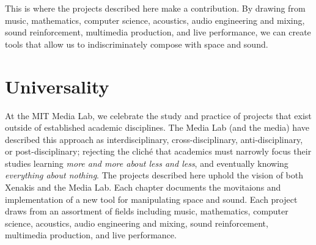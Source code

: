 This is where the projects described here make a contribution.  By
drawing from music, mathematics, computer science, acoustics, audio
engineering and mixing, sound reinforcement, multimedia production,
and live performance, we can create tools that allow us to
indiscriminately compose with space and sound.

\section{Universality}
\label{sec:universality}
At the MIT Media Lab, we celebrate the study and practice of projects
that exist outside of established academic disciplines. The Media Lab
(and the media) have described this approach as interdisciplinary,
cross-disciplinary, anti-disciplinary, or post-disciplinary; rejecting
the clich\'{e} that academics must narrowly focus their studies
learning \textit{more and more about less and less}, and eventually
knowing \textit{everything about nothing}.  The projects described
here uphold the vision of both Xenakis and the Media Lab. Each chapter
documents the movitaions and implementation of a new tool for
manipulating space and sound. Each project draws from an assortment of
fields including music, mathematics, computer science, acoustics,
audio engineering and mixing, sound reinforcement, multimedia
production, and live performance. 






